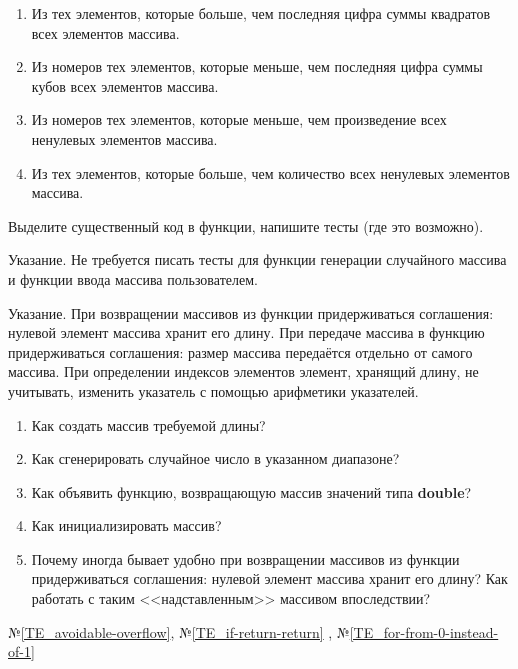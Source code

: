 \begin{enumerate}
	\item
		Из тех элементов, которые больше, чем последняя цифра суммы квадратов всех элементов массива.

	\item
		Из номеров тех элементов, которые меньше, чем последняя цифра суммы кубов всех элементов массива.

	\item
		Из номеров тех элементов, которые меньше, чем произведение всех ненулевых элементов массива.

	\item
		Из тех элементов, которые больше, чем количество всех ненулевых элементов массива.

\end{enumerate}


\labtask

Выделите существенный код в функции, напишите тесты (где это возможно).

Указание. Не требуется писать тесты для функции генерации случайного массива и функции ввода массива пользователем. 

Указание. При возвращении массивов из функции придерживаться соглашения: нулевой элемент массива хранит его длину.
При передаче массива в функцию придерживаться соглашения: размер массива передаётся отдельно от самого массива.
При определении индексов элементов элемент, хранящий длину, не учитывать, изменить указатель с помощью арифметики указателей.

\labworkquestions

\begin{enumerate}

	\item
		Как создать массив требуемой длины?
	\item
		Как сгенерировать случайное число в указанном диапазоне?
	\item
		Как объявить функцию, возвращающую массив значений типа \textbf{double}?
	\item
		Как инициализировать массив?
	\item
		Почему иногда бывает удобно при возвращении массивов из функции придерживаться соглашения: нулевой элемент массива хранит его длину?
		Как работать с таким <<надставленным>> массивом впоследствии?
\end{enumerate}

\typerrors
№\ref{TE_avoidable-overflow},
№\ref{TE_if-return-return}%
, №\ref{TE_for-from-0-instead-of-1}


